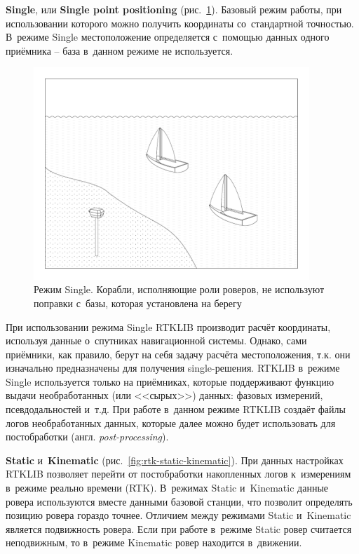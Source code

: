 \begin{dashitemize}
  \item \textbf{Single}, или \textbf{Single point positioning} (рис.~\ref{fig:rtk-single}). Базовый режим работы, при использовании которого можно получить координаты со~стандартной точностью. В~режиме Single местоположение определяется с~помощью данных одного приёмника -- база в~данном режиме не используется.
  
  \begin{figure}[h!]
    \centering
    \setlength{\fboxsep}{5pt}
    \includegraphics[height=8cm]{img/tikz/rtk-single/pic}
    \caption{Режим Single. Корабли, исполняющие роли роверов, не используют поправки с~базы, которая установлена на берегу}\label{fig:rtk-single}
  \end{figure}

  При использовании режима Single RTKLIB производит расчёт координаты, используя данные о~спутниках навигационной системы. Однако, сами приёмники, как правило, берут на себя задачу расчёта местоположения, т.к. они изначально предназначены для получения single-решения.
  RTKLIB в~режиме Single используется только на приёмниках, которые поддерживают функцию выдачи необработанных (или <<сырых>>) данных: фазовых измерений, псевдодальностей и~т.д. При работе в~данном режиме RTKLIB создаёт файлы логов необработанных данных, которые далее можно будет использовать для постобработки (англ. \emph{post-processing}).
  
  \item \textbf{Static} и~\textbf{Kinematic} (рис.~\ref{fig:rtk-static-kinematic}). При данных настройках RTKLIB позволяет перейти от постобработки накопленных логов к~измерениям в~режиме реально времени (RTK). В~режимах Static и~Kinematic данные ровера используются вместе данными базовой станции, что позволит определять позицию ровера гораздо точнее.
  Отличием между режимами Static и~Kinematic является подвижность ровера. Если при работе в~режиме Static ровер считается неподвижным, то в~режиме Kinematic ровер находится в~движении.
  

\end{dashitemize}

